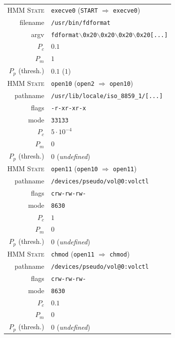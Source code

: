 \begin{table}[p]
  \centering
  \begin{tabular}{rl}
    \toprule
    \textsc{HMM State} & \texttt{execve0} (\texttt{START} $\Rightarrow$ \texttt{execve0}) \\
    \cmidrule{2-2}
    filename & \texttt{/usr/bin/fdformat}\\
    argv & \texttt{fdformat$\backslash$0x20$\backslash$0x20$\backslash$0x20$\backslash$0x20[...]} \\
    \cmidrule{2-2}
    $P_c$ & $0.1$ \\
    $P_m$ & $1$ \\
    $P_p$ (thresh.) & $0.1$ ($1$)\\
    \midrule

    \textsc{HMM State} & \texttt{open10} (\texttt{open2} $\Rightarrow$ \texttt{open10}) \\
    \cmidrule{2-2}
    pathname & \texttt{/usr/lib/locale/iso\_8859\_1/[...]}\\
    flags & \texttt{-r-xr-xr-x} \\
    mode & \texttt{33133}\\
    \cmidrule{2-2}
    $P_c$ & $5 \cdot 10^{-4}$ \\
    $P_m$ & $0$ \\
    $P_p$ (thresh.) & $0$ (\emph{undefined})\\
    \midrule

    \textsc{HMM State} & \texttt{open11} (\texttt{open10} $\Rightarrow$ \texttt{open11}) \\
    \cmidrule{2-2}
    pathname & \texttt{/devices/pseudo/vol@0:volctl}\\
    flags & \texttt{crw-rw-rw-} \\
    mode & \texttt{8630}\\
    \cmidrule{2-2}
    $P_c$ & $1$ \\
    $P_m$ & $0$ \\
    $P_p$ (thresh.) & $0$ (\emph{undefined})\\
    \midrule

    \textsc{HMM State} & \texttt{chmod} (\texttt{open11} $\Rightarrow$ \texttt{chmod}) \\
    \cmidrule{2-2}
    pathname & \texttt{/devices/pseudo/vol@0:volctl}\\
    flags & \texttt{crw-rw-rw-} \\
    mode & \texttt{8630}\\
    \cmidrule{2-2}
    $P_c$ & $0.1$\\
    $P_m$ & $0$ \\
    $P_p$ (thresh.) & $0$ (\emph{undefined})\\
    \midrule


\end{tabular}
\end{table}
